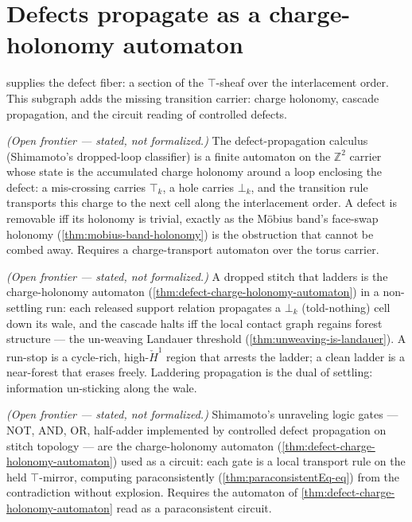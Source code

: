 \section{Defects propagate as a charge-holonomy automaton}

 supplies the defect fiber: a section of
the $\top$-sheaf over the interlacement order.  This subgraph adds the missing
transition carrier: charge holonomy, cascade propagation, and the circuit reading
of controlled defects.

\begin{theorem}\label{thm:defect-charge-holonomy-automaton}\notready{}
\emph{(Open frontier --- stated, not formalized.)} The defect-propagation calculus
(Shimamoto's dropped-loop classifier) is a finite automaton on the $\mathbb{Z}^2$ carrier
whose state is the accumulated charge holonomy around a loop enclosing the defect: a
mis-crossing carries $\top_k$, a hole carries $\bot_k$, and the transition rule transports
this charge to the next cell along the interlacement order. A defect is removable iff its
holonomy is trivial, exactly as the M\"obius band's face-swap holonomy
(\cref{thm:mobius-band-holonomy}) is the obstruction that cannot be combed away. Requires a
charge-transport automaton over the torus carrier.
\end{theorem}

\begin{theorem}\label{thm:laddering-charge-cascade}\notready{}
\emph{(Open frontier --- stated, not formalized.)} A dropped stitch that ladders is the
charge-holonomy automaton (\cref{thm:defect-charge-holonomy-automaton}) in a non-settling
run: each released support relation propagates a $\bot_k$ (told-nothing) cell down its wale,
and the cascade halts iff the local contact graph regains forest structure --- the
un-weaving Landauer threshold (\cref{thm:unweaving-is-landauer}). A run-stop is a
cycle-rich, high-$\check H^1$ region that arrests the ladder; a clean ladder is a near-forest
that erases freely. Laddering propagation is the dual of settling: information un-sticking
along the wale.
\end{theorem}

\begin{theorem}\label{thm:unraveling-gates-paraconsistent}\notready{}
\emph{(Open frontier --- stated, not formalized.)} Shimamoto's unraveling logic gates ---
NOT, AND, OR, half-adder implemented by controlled defect propagation on stitch topology ---
are the charge-holonomy automaton (\cref{thm:defect-charge-holonomy-automaton}) used as a
circuit: each gate is a local transport rule on the held $\top$-mirror, computing
paraconsistently (\cref{thm:paraconsistentEq-eq}) from the contradiction without explosion.
Requires the automaton of \cref{thm:defect-charge-holonomy-automaton} read as a
paraconsistent circuit.
\end{theorem}
